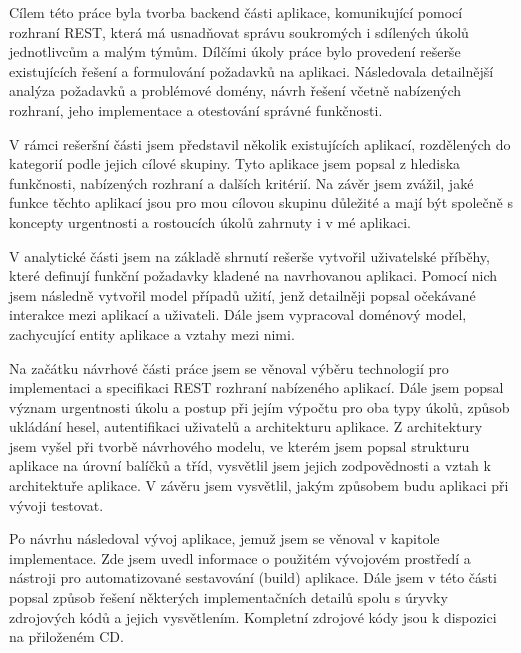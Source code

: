 \documentclass[thesis=B,czech]{FITthesis}[2012/06/26]
\begin{document}
	



\begin{conclusion}
	Cílem této práce byla tvorba backend části aplikace, komunikující pomocí rozhraní REST, která má usnadňovat správu soukromých i sdílených úkolů jednotlivcům a malým týmům. Dílčími úkoly práce bylo provedení rešerše existujících řešení a formulování požadavků na aplikaci. Následovala detailnější analýza požadavků a problémové domény, návrh řešení včetně nabízených rozhraní, jeho implementace a otestování správné funkčnosti.
	
	
	V rámci rešeršní části jsem představil několik existujících aplikací, rozdělených do kategorií podle jejich cílové skupiny. Tyto aplikace jsem popsal z hlediska funkčnosti, nabízených rozhraní a dalších kritérií. Na závěr jsem zvážil, jaké funkce těchto aplikací jsou pro mou cílovou skupinu důležité a mají být společně s koncepty urgentnosti a rostoucích úkolů zahrnuty i v mé aplikaci. 
	
	V analytické části jsem na základě shrnutí rešerše vytvořil uživatelské příběhy, které definují funkční požadavky kladené na navrhovanou aplikaci. Pomocí nich jsem následně vytvořil model případů užití, jenž detailněji popsal očekávané interakce mezi aplikací a uživateli. Dále jsem vypracoval doménový model, zachycující entity aplikace a vztahy mezi nimi.
	
	Na začátku návrhové části práce jsem se věnoval výběru technologií pro implementaci a specifikaci REST rozhraní nabízeného aplikací. Dále jsem popsal význam urgentnosti úkolu a postup při jejím výpočtu pro oba typy úkolů, způsob ukládání hesel, autentifikaci uživatelů a architekturu aplikace. Z architektury jsem vyšel při tvorbě návrhového modelu, ve kterém jsem popsal strukturu aplikace na úrovní balíčků a tříd, vysvětlil jsem jejich zodpovědnosti a vztah k architektuře aplikace. V závěru jsem vysvětlil, jakým způsobem budu aplikaci při vývoji testovat.
	
	Po návrhu následoval vývoj aplikace, jemuž jsem se věnoval v kapitole implementace. Zde jsem uvedl informace o použitém vývojovém prostředí a nástroji pro automatizované sestavování (build) aplikace. Dále jsem v této části popsal způsob řešení některých implementačních detailů spolu s úryvky zdrojových kódů a jejich vysvětlením. Kompletní zdrojové kódy jsou k dispozici na přiloženém CD.
	

\end{conclusion}
\end{document}

